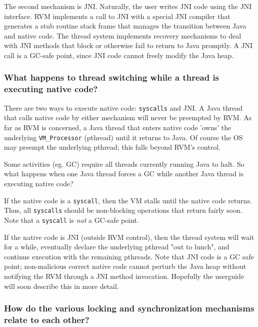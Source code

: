 The second mechanism is JNI.  Naturally, the user writes JNI code 
using the JNI interface.  RVM implements a call to JNI with a special JNI
compiler that generates a stub routine stack frame that manages the
transition between Java and native code.  The thread system implements 
recovery mechanisms to deal with JNI methods that block or otherwise fail
to return to Java promptly.  A JNI call is a GC-safe point, since JNI code
cannot freely modify the Java heap.

\subsubsection{What happens to thread switching while a thread is
executing native code?}


There are two ways to execute native code: {\tt syscalls} and JNI.
A Java thread that calls native code by either mechanism will never
be preempted by RVM.  As far as RVM is concerned, a Java thread that
enters native code 'owns' the underlying {\tt VM\_Processor} (pthread)
until it returns to Java.  Of course the OS may preempt the underlying
pthread; this falls beyond RVM's control.

Some activities (eg. GC) require all threads currently running Java to halt.  
So what happens when one Java thread forces a GC while another Java thread is
executing native code?

If the native code is a {\tt syscall}, then the VM stalls until the native
code returns.  Thus, all {\tt syscalls} should be non-blocking
operations that return fairly soon.  Note that a {\tt syscall} is 
{\em not} a GC-safe point.

If the native code is JNI (outside RVM control), then the thread system
will wait for a while, eventually declare the underlying pthread "out to
lunch", and continue execution with the remaining pthreads.  Note that 
JNI code is a GC safe point; non-malicious correct native code cannot
perturb the Java heap without notifying the RVM through a JNI method
invocation.  Hopefully the userguide will soon describe this in more
detail.

\subsubsection{How do the various locking and synchronization mechanisms
relate to each other?}

